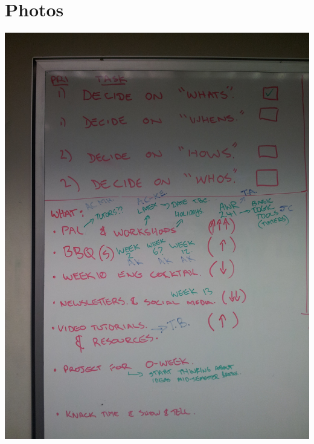 \section{Photos}
\label{sec:Photos}
\includegraphics[angle=270, width=\textwidth]{img/IMG_20120706_181217.jpg}
\newpage
